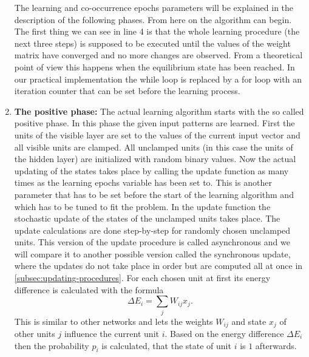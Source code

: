 \documentclass[12pt,twoside]{article}
\theoremstyle{plain}
\theoremstyle{definition}
\theoremstyle{remark}
\begin{document}
\begin{enumerate}
        The learning and co-occurrence epochs parameters will be explained in the description of the following phases.\newline
        From here on the algorithm can begin. The first thing we can see in line 4 is that the whole learning procedure (the next three steps) is
        supposed to be executed until the values of the weight matrix have converged and no more changes are observed.
        From a theoretical point of view this happens when the equilibrium state has been reached. 
        In our practical implementation the while loop is replaced by a for loop with an iteration counter that can be set before the learning process.
    \item \textbf{The positive phase:}\newline
        The actual learning algorithm starts with the so called positive phase. In this phase the given input patterns are learned.
        First the units of the visible layer are set to the values of the current input vector and all visible units are clamped.
        All unclamped units (in this case the units of the hidden layer) are initialized with random binary values.
        Now the actual updating of the states takes place by calling the update function as many times as the learning epochs variable has been set to.
        This is another parameter that has to be set before the start of the learning algorithm and which has to be tuned to fit the problem.\newline
        In the update function the stochastic update of the states of the unclamped units takes place. The update calculations are done
        step-by-step for randomly chosen unclamped units. This version of the update procedure is called asynchronous and we will
        compare it to another possible version called the synchronous update, where the updates do not take place in order
        but are computed all at once in \cref{subsec:updating-procedures}.\newline
        For each chosen unit at first its energy difference is calculated with the formula
        $$\Delta E_i = \sum_j W_{ij} x_j.$$
        This is similar to other networks and lets the weights $W_{ij}$ and state $x_j$ of other units $j$ influence the current unit $i$. 
        Based on the energy difference $\Delta E_i$ then the probability $p_i$ is calculated, that the state of unit $i$ is $1$ afterwards.

\end{enumerate}
\end{document}
